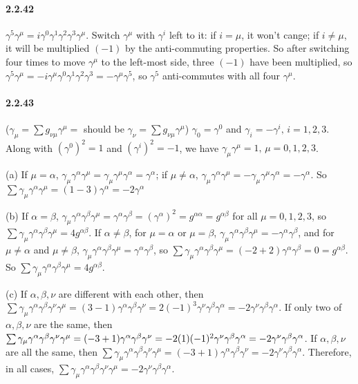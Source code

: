 \documentclass[a4paper]{article}
\begin{document}
\paragraph{2.2.42}
$\gamma^5\gamma^\mu=i\gamma^0\gamma^1\gamma^2\gamma^3\gamma^\mu$. Switch $\gamma^\mu$ with $\gamma^i$ left to it: if $i=\mu$, it won't cange; if $i\neq\mu$, it will be multiplied $(-1)$ by the anti-commuting properties. So after switching four times to move $\gamma^\mu$ to the left-most side, three $(-1)$ have been multiplied, so $\gamma^5\gamma^\mu=-i\gamma^\mu\gamma^0\gamma^1\gamma^2\gamma^3=-\gamma^\mu\gamma^5$, so $\gamma^5$ anti-commutes with all four $\gamma^\mu$.

\paragraph{2.2.43}
($\gamma_\mu=\sum g_{\nu\mu}\gamma^\mu=$ should be $\gamma_\nu=\sum g_{\nu\mu}\gamma^\mu$) $\gamma_0=\gamma^0$ and $\gamma_i=-\gamma ^i,\,i=1,2,3$. Along with $(\gamma^0)^2=1$ and $(\gamma^i)^2=-1$, we have $\gamma_\mu\gamma^\mu=1,\,\mu=0,1,2,3$.
\medskip

(a) If $\mu=\alpha$, $\gamma_\mu\gamma^\alpha\gamma^\mu=\gamma_\mu\gamma^\mu\gamma^\alpha=\gamma^\alpha$; if $\mu\neq\alpha$, $\gamma_\mu\gamma^\alpha\gamma^\mu=-\gamma_\mu\gamma^\mu\gamma^\alpha=-\gamma^\alpha$. So $\sum\gamma_\mu\gamma^\alpha\gamma^\mu=(1-3)\gamma^\alpha=-2\gamma^\alpha$
\medskip

(b) If $\alpha=\beta$, $\gamma_\mu\gamma^\alpha\gamma^\beta\gamma^\mu=\gamma^\alpha\gamma^\beta=(\gamma^\alpha)^2=g^{\alpha\alpha}=g^{\alpha\beta}$ for all $\mu=0,1,2,3$, so $\sum\gamma_\mu\gamma^\alpha\gamma^\beta\gamma^\mu=4g^{\alpha\beta}$. If $\alpha\neq\beta$, for $\mu=\alpha$ or $\mu=\beta$, $\gamma_\mu\gamma^\alpha\gamma^\beta\gamma^\mu=-\gamma^\alpha\gamma^\beta$, and for $\mu\neq\alpha$ and $\mu\neq\beta$, $\gamma_\mu\gamma^\alpha\gamma^\beta\gamma^\mu=\gamma^\alpha\gamma^\beta$, so $\sum\gamma_\mu\gamma^\alpha\gamma^\beta\gamma^\mu=(-2+2)\gamma^\alpha\gamma^\beta=0=g^{\alpha\beta}$. So $\sum\gamma_\mu\gamma^\alpha\gamma^\beta\gamma^\mu=4g^{\alpha\beta}$.
\medskip

(c)
If $\alpha,\beta,\nu$ are different with each other, then $\sum\gamma_\mu\gamma^\alpha\gamma^\beta\gamma^\nu\gamma^\mu=(3-1)\gamma^\alpha\gamma^\beta\gamma^\nu=2(-1)^3\gamma^\nu\gamma^\beta\gamma^\alpha=-2\gamma^\nu\gamma^\beta\gamma^\alpha$. If only two of  $\alpha,\beta,\nu$ are the same, then $\sum\gamma_\mu\gamma^\alpha\gamma^\beta\gamma^\nu\gamma^\mu=(-3+1)\gamma^\alpha\gamma^\beta\gamma^\nu=-2(1)(-1)^2\gamma^\nu\gamma^\beta\gamma^\alpha\\=-2\gamma^\nu\gamma^\beta\gamma^\alpha$. If $\alpha,\beta,\nu$ are all the same, then $\sum\gamma_\mu\gamma^\alpha\gamma^\beta\gamma^\nu\gamma^\mu=(-3+1)\gamma^\alpha\gamma^\beta\gamma^\nu=-2\gamma^\nu\gamma^\beta\gamma^\alpha$. Therefore, in all cases, $\sum\gamma_\mu\gamma^\alpha\gamma^\beta\gamma^\nu\gamma^\mu=-2\gamma^\nu\gamma^\beta\gamma^\alpha$.
\end{document}
